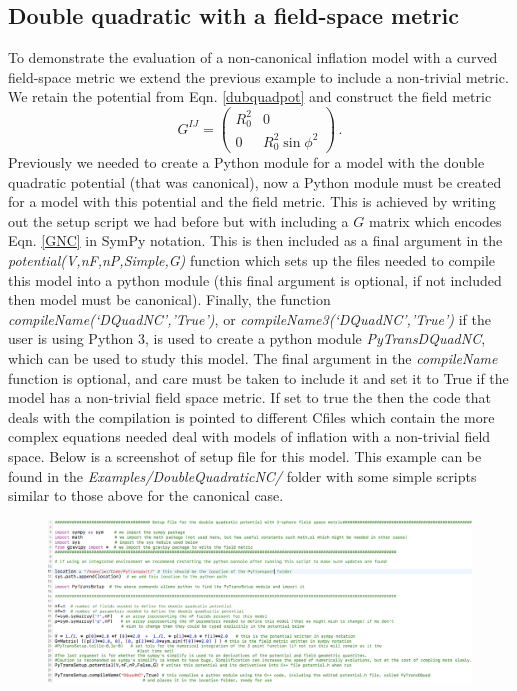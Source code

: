 \documentclass[10pt,
amsmath,amssymb,
aps,prd,nofootinbib,eqsecnum,a4paper]{revtex4}
\def\be{\begin{equation}}
\def\ee{\end{equation}}
\newcommand{\CC}{C\nolinebreak\hspace{-.05em}\raisebox{.4ex}{\tiny\bf +}\nolinebreak\hspace{-.10em}\raisebox{.4ex}{\tiny\bf +}}
\def\CC{{C\nolinebreak[4]\hspace{-.05em}\raisebox{.4ex}{\tiny\bf ++}}}
\begin{document}
\subsection{Double quadratic with a field-space metric}
\label{NCexample}
To demonstrate the evaluation of a non-canonical inflation model with a curved field-space metric 
we extend the previous example to include a non-trivial metric. 
We retain the potential from Eqn. \ref{dubquadpot} and construct the field metric
\be
\label{GNC}
G^{IJ}=\left(\begin{matrix}
R_0^2 & 0\\
0 & R_0^2\sin\phi^2
\end{matrix}\right)\,.
\ee
Previously we needed to create a Python module for a model with the double quadratic potential (that was canonical),
now a Python module must be created for a model with this potential and the field metric. This is achieved by writing out the setup script we had before but with including a $G$ matrix which encodes Eqn. \ref{GNC} in SymPy notation. 
This is then included as a final argument in the {\it potential(V,nF,nP,Simple,G)} function which sets up the files needed to compile this model 
into a python module (this final argument is optional, if not included then model must be canonical). 
Finally, the function {\it compileName(`DQuadNC','True')}, or {\it compileName3(`DQuadNC','True')} if the user is using Python 3, is 
used to create a python module {\it PyTransDQuadNC}, which can be used to study this model. The final argument in the {\it compileName} function is optional, and care must be taken to include it and set it to True if the model has a 
non-trivial field space metric. 
If set to true the then the code that deals with the compilation is pointed to different \CC files 
which contain the more complex equations needed deal with models of inflation
with a non-trivial field space. Below is a 
screenshot of setup file for this model. This example can be found in the {\it Examples/DoubleQuadraticNC/} folder with 
some simple scripts similar to those above for the canonical case.
\begin{figure}[H]
\centering
\includegraphics[width=18.0cm]{NCsetup}
\end{figure}
\end{document}
